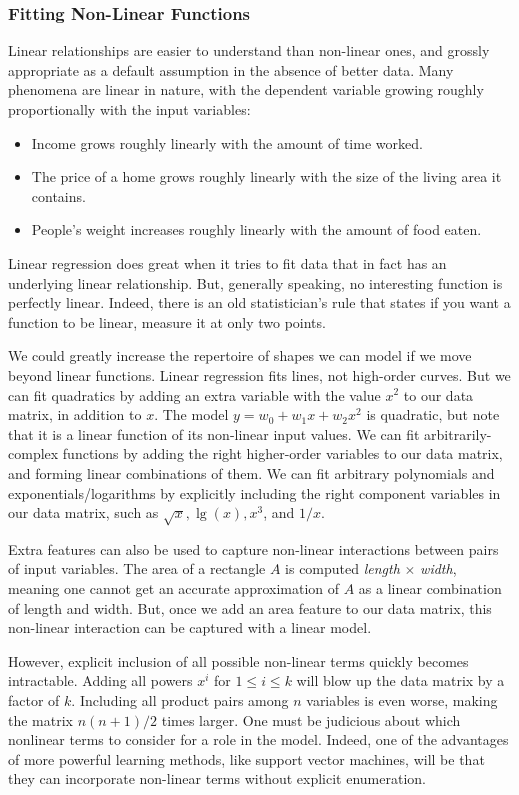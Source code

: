 \documentclass[10pt]{article}
\begin{document}
\subsubsection{Fitting Non-Linear Functions}
Linear relationships are easier to understand than non-linear ones, and grossly appropriate as a default assumption in the absence of better data. Many phenomena are linear in nature, with the dependent variable growing roughly proportionally with the input variables:
\begin{itemize}
    \item Income grows roughly linearly with the amount of time worked.
    \item The price of a home grows roughly linearly with the size of the living area it contains.
    \item People's weight increases roughly linearly with the amount of food eaten.
\end{itemize}

Linear regression does great when it tries to fit data that in fact has an underlying linear relationship. But, generally speaking, no interesting function is perfectly linear. Indeed, there is an old statistician's rule that states if you want a function to be linear, measure it at only two points.

We could greatly increase the repertoire of shapes we can model if we move beyond linear functions. Linear regression fits lines, not high-order curves. But we can fit quadratics by adding an extra variable with the value $x^{2}$ to our data matrix, in addition to $x$. The model $y=w_{0}+w_{1}x+w_{2}x^{2}$ is quadratic, but note that it is a linear function of its non-linear input values. We can fit arbitrarily-complex functions by adding the right higher-order variables to our data matrix, and forming linear combinations of them. We can fit arbitrary polynomials and exponentials/logarithms by explicitly including the right component variables in our data matrix, such as $\sqrt{x}, \lg (x), x^{3}$, and $1 / x$.

Extra features can also be used to capture non-linear interactions between pairs of input variables. The area of a rectangle $A$ is computed \textit{length} $\times$ \textit{width}, meaning one cannot get an accurate approximation of $A$ as a linear combination of length and width. But, once we add an area feature to our data matrix, this non-linear interaction can be captured with a linear model.

However, explicit inclusion of all possible non-linear terms quickly becomes intractable. Adding all powers $x^{i}$ for $1 \leq i \leq k$ will blow up the data matrix by a factor of $k$. Including all product pairs among $n$ variables is even worse, making the matrix $n(n+1) / 2$ times larger. One must be judicious about which nonlinear terms to consider for a role in the model. Indeed, one of the advantages of more powerful learning methods, like support vector machines, will be that they can incorporate non-linear terms without explicit enumeration.
\end{document}
